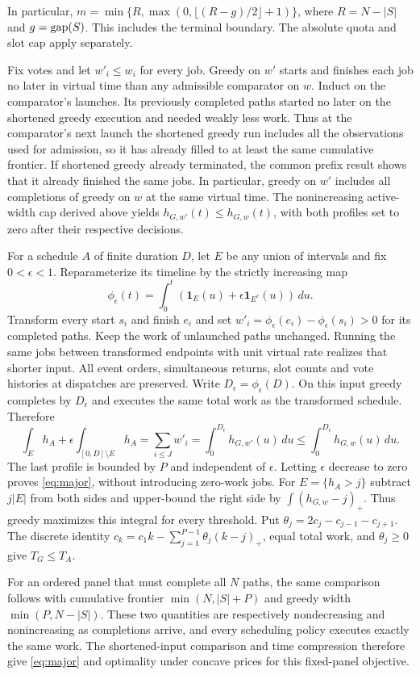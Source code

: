 In particular, $m=\min\{R,\max(0,\lfloor(R-g)/2\rfloor+1)\}$, where $R=N-|S|$ and $g=\operatorname{gap}(S)$. This includes the terminal boundary. The absolute quota and slot cap apply separately.

Fix votes and let $w'_i\le w_i$ for every job. Greedy on $w'$ starts and finishes each job no later in virtual time than any admissible comparator on $w$. Induct on the comparator's launches. Its previously completed paths started no later on the shortened greedy execution and needed weakly less work. Thus at the comparator's next launch the shortened greedy run includes all the observations used for admission, so it has already filled to at least the same cumulative frontier. If shortened greedy already terminated, the common prefix result shows that it already finished the same jobs. In particular, greedy on $w'$ includes all completions of greedy on $w$ at the same virtual time. The nonincreasing active-width cap derived above yields $h_{G,w'}(t)\le h_{G,w}(t)$, with both profiles set to zero after their respective decisions.

For a schedule $A$ of finite duration $D$, let $E$ be any union of intervals and fix $0<\epsilon<1$. Reparameterize its timeline by the strictly increasing map
\[
 \phi_\epsilon(t)=\int_0^t (\mathbf{1}_E(u)+\epsilon\mathbf{1}_{E^c}(u))\,du .
\]
Transform every start $s_i$ and finish $e_i$ and set $w'_i=\phi_\epsilon(e_i)-\phi_\epsilon(s_i)>0$ for its completed paths. Keep the work of unlaunched paths unchanged. Running the same jobs between transformed endpoints with unit virtual rate realizes that shorter input. All event orders, simultaneous returns, slot counts and vote histories at dispatches are preserved. Write $D_\epsilon=\phi_\epsilon(D)$. On this input greedy completes by $D_\epsilon$ and executes the same total work as the transformed schedule. Therefore
\[
 \int_E h_A+\epsilon\int_{[0,D]\setminus E}h_A
 =\sum_{i\le J}w'_i=\int_0^{D_\epsilon}h_{G,w'}(u)\,du
 \le \int_0^{D_\epsilon}h_{G,w}(u)\,du .
\]
The last profile is bounded by $P$ and independent of $\epsilon$. Letting $\epsilon$ decrease to zero proves \eqref{eq:major}, without introducing zero-work jobs. For $E=\{h_A>j\}$ subtract $j|E|$ from both sides and upper-bound the right side by $\int (h_{G,w}-j)_+$. Thus greedy maximizes this integral for every threshold. Put $\theta_j=2c_j-c_{j-1}-c_{j+1}$. The discrete identity $c_k=c_1k-\sum_{j=1}^{P-1}\theta_j(k-j)_+$, equal total work, and $\theta_j\ge0$ give $T_G\le T_A$.

For an ordered panel that must complete all $N$ paths, the same comparison follows with cumulative frontier $\min(N,|S|+P)$ and greedy width $\min(P,N-|S|)$. These two quantities are respectively nondecreasing and nonincreasing as completions arrive, and every scheduling policy executes exactly the same work. The shortened-input comparison and time compression therefore give \eqref{eq:major} and optimality under concave prices for this fixed-panel objective.

